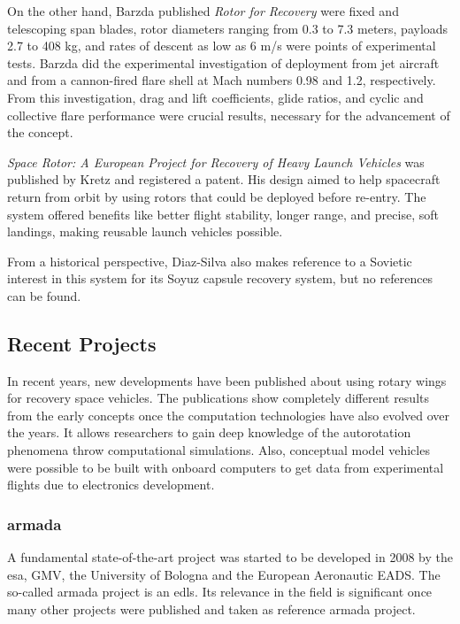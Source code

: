 On the other hand, Barzda published \textit{Rotor for Recovery} were fixed and telescoping span blades, rotor diameters ranging from 0.3 to 7.3 meters, payloads 2.7 to 408 kg, and rates of descent as low as 6 m/s were points of experimental tests. Barzda did the experimental investigation of deployment from jet aircraft and from a cannon-fired flare shell at  Mach numbers 0.98 and 1.2, respectively. From this investigation, drag and lift coefficients, glide ratios, and cyclic and collective flare performance were crucial results, necessary for the advancement of the concept.

\textit{Space Rotor: A European Project for Recovery of Heavy Launch Vehicles} was published by Kretz and registered a patent. His design aimed to help spacecraft return from orbit by using rotors that could be deployed before re-entry. The system offered benefits like better flight stability, longer range, and precise, soft landings, making reusable launch vehicles possible.

From a historical perspective, Diaz-Silva \cite{diaz-silva_rotary_2013} also makes reference to a Sovietic interest in this system for its Soyuz capsule recovery system, but no references can be found.

\subsection{Recent Projects}
\label{sec:recent_projects}


In recent years, new developments have been published about using rotary wings for recovery space vehicles. The publications show completely different results from the early concepts once the computation technologies have also evolved over the years. It allows researchers to gain deep knowledge of the autorotation phenomena throw computational simulations. Also, conceptual model vehicles were possible to be built with onboard computers to get data from experimental flights due to electronics development.

\subsubsection{\gls{armada}}

A fundamental state-of-the-art project was started to be developed in 2008  by the \gls{esa}, GMV, the University of Bologna and the European Aeronautic \gls{EADS}. The so-called \gls{armada} project \cite{noauthor_armada_nodate} is an \gls{edls}. Its relevance in the field is significant once many other projects were published and taken as reference \gls{armada} project. 

